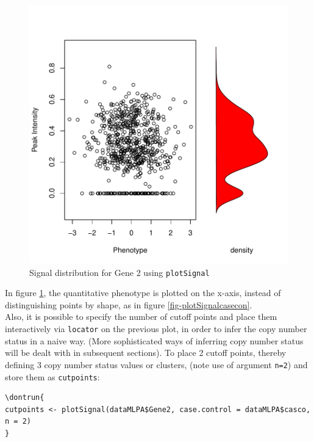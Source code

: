 \documentclass[11pt]{article}
\begin{document}
\begin{figure}[ht]
\begin{center}
\includegraphics{CNVassoc_vignette-009}
\caption{\small Signal distribution for Gene 2 using \texttt{plotSignal}}
\label{fig-plotSignalquanti}
\end{center}
\end{figure}

In figure \ref{fig-plotSignalquanti}, the quantitative phenotype is plotted on the x-axis, instead of distinguishing points by shape, as in figure \ref{fig-plotSignalcasecon}.\\


Also, it is possible to specify the number of cutoff points and place them interactively via \texttt{locator} on the previous plot, 
in order to infer the copy number status in a naive way. (More sophisticated ways of inferring copy number status will be dealt with in subsequent sections). To place 2 cutoff points, thereby defining 3 copy number status values or clusters,
(note use of argument \texttt{n=2}) and store them as \texttt{cutpoints}:


\begin{verbatim}
\dontrun{
cutpoints <- plotSignal(dataMLPA$Gene2, case.control = dataMLPA$casco, n = 2)
}
\end{verbatim}
\end{document}
